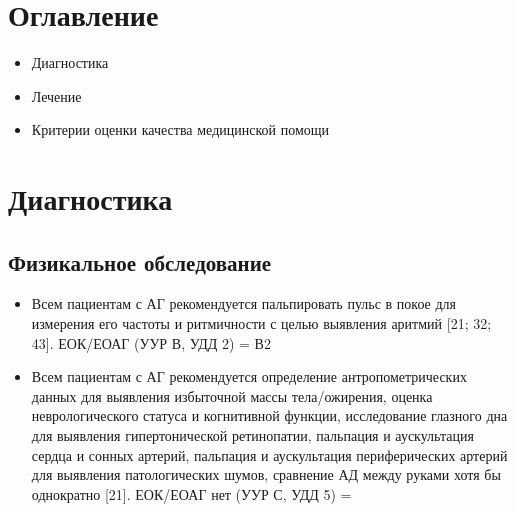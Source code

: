 \documentclass{article}%
\begin{document}
%
\normalsize%
\section*{Оглавление}%
\label{sec:}%
\begin{itemize}%
\item%
Диагностика%
\item%
Лечение%
\item%
Критерии оценки качества медицинской помощи%
\end{itemize}

%
\newpage%
\section{Диагностика}%
\label{sec:}%
\subsection{Физикальное обследование}%
\label{subsec:}%
\begin{itemize}%
\item%
Всем пациентам с АГ рекомендуется пальпировать пульс в покое для измерения его частоты и ритмичности с целью выявления аритмий {[}21; 32; 43{]}.%
\newline%
ЕОК/ЕОАГ (УУР В, УДД 2) = В2%
\item%
Всем пациентам с АГ рекомендуется определение антропометрических данных для выявления избыточной массы тела/ожирения, оценка неврологического статуса и когнитивной функции, исследование глазного дна для выявления гипертонической ретинопатии, пальпация и аускультация сердца и сонных артерий, пальпация и аускультация периферических артерий для выявления патологических шумов, сравнение АД между руками хотя бы однократно {[}21{]}.%
\newline%
ЕОК/ЕОАГ нет (УУР С, УДД 5) = %
%
\end{itemize}

%
\end{document}
